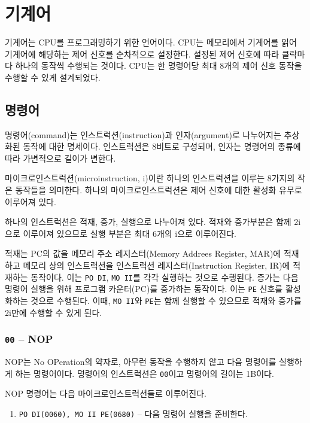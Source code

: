 \documentclass{article}
\begin{document}
\section{기계어}
\label{sec:machlang}

기계어는 CPU를 프로그래밍하기 위한 언어이다.
CPU는 메모리에서 기계어를 읽어 기계어에 해당하는
제어 신호를 순차적으로 설정한다.
설정된 제어 신호에 따라 클락마다 하나의 동작씩 수행되는 것이다.
CPU는 한 명령어당 최대 8개의 제어 신호 동작을 수행할 수 있게
설계되었다.

\subsection{명령어}

명령어(command)는 인스트럭션(instruction)과
인자(argument)로 나누어지는 추상화된 동작에 대한 명세이다.
인스트럭션은 8비트로 구성되며, 인자는 명령어의 종류에 따라
가변적으로 길이가 변한다.

마이크로인스트럭션(microinstruction, \textmu i)이란
하나의 인스트럭션을 이루는 8가지의 작은 동작들을 의미한다.
하나의 마이크로인스트럭션은 제어 신호에 대한 활성화 유무로 이루어져 있다.

하나의 인스트럭션은 적재, 증가, 실행으로 나누어져 있다.
적재와 증가부분은 함께 2\textmu i으로 이루어져 있으므로
실행 부분은 최대 6개의 \textmu i으로 이루어진다.

적재는 PC의 값을 메모리 주소 레지스터(Memory Addrees Register, MAR)에
적재하고 메모리 상의 인스트럭션을 인스트럭션 레지스터(Instruction Register, IR)에
적재하는 동작이다. 이는 \texttt{PO DI}, \texttt{MO II}를 각각 실행하는 것으로 수행된다.
증가는 다음 명령어 실행을 위해 프로그램 카운터(PC)를 증가하는 동작이다.
이는 \texttt{PE} 신호를 활성화하는 것으로 수행된다.
이때, \texttt{MO II}와 \texttt{PE}는 함께 실행할 수 있으므로
적재와 증가를 2\textmu i만에 수행할 수 있게 된다.

\subsubsection{\texttt{00} -- NOP}

NOP는 No OPeration의 약자로, 아무런 동작을 수행하지 않고
다음 명령어를 실행하게 하는 명령어이다.
명령어의 인스트럭션은 \texttt{00}이고 명령어의 길이는 1B이다.

NOP 명령어는 다음 마이크로인스트럭션들로 이루어진다.

\begin{enumerate}
    \item \texttt{PO DI(0060), MO II PE(0680)} -- 다음 명령어 실행을 준비한다.
    \setcounter{enumi}{2}
\end{enumerate}
\end{document}

